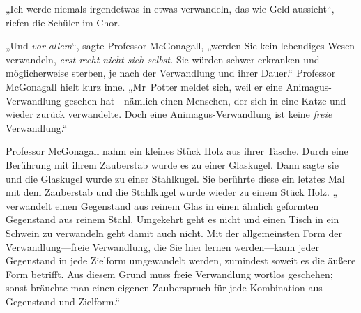 „Ich werde niemals irgendetwas in etwas verwandeln, das wie Geld aussieht“, riefen die Schüler im Chor.

„Und \emph{vor allem}“, sagte Professor McGonagall, „werden Sie kein lebendiges Wesen verwandeln, \emph{erst recht nicht sich selbst.} Sie würden schwer erkranken und möglicherweise sterben, je nach der Verwandlung und ihrer Dauer.“ Professor McGonagall hielt kurz inne. „Mr~Potter meldet sich, weil er eine Animagus-Verwandlung gesehen hat—nämlich einen Menschen, der sich in eine Katze und wieder zurück verwandelte. Doch eine Animagus-Verwandlung ist keine \emph{freie} Verwandlung.“

Professor McGonagall nahm ein kleines Stück Holz aus ihrer Tasche. Durch eine Berührung mit ihrem Zauberstab wurde es zu einer Glaskugel. Dann sagte sie  und die Glaskugel wurde zu einer Stahlkugel. Sie berührte diese ein letztes Mal mit dem Zauberstab und die Stahlkugel wurde wieder zu einem Stück Holz. „{} verwandelt einen Gegenstand aus reinem Glas in einen ähnlich geformten Gegenstand aus reinem Stahl. Umgekehrt geht es nicht und einen Tisch in ein Schwein zu verwandeln geht damit auch nicht. Mit der allgemeinsten Form der Verwandlung—freie Verwandlung, die Sie hier lernen werden—kann jeder Gegenstand in jede Zielform umgewandelt werden, zumindest soweit es die äußere Form betrifft. Aus diesem Grund muss freie Verwandlung wortlos geschehen; sonst bräuchte man einen eigenen Zauberspruch für jede Kombination aus Gegenstand und Zielform.“

